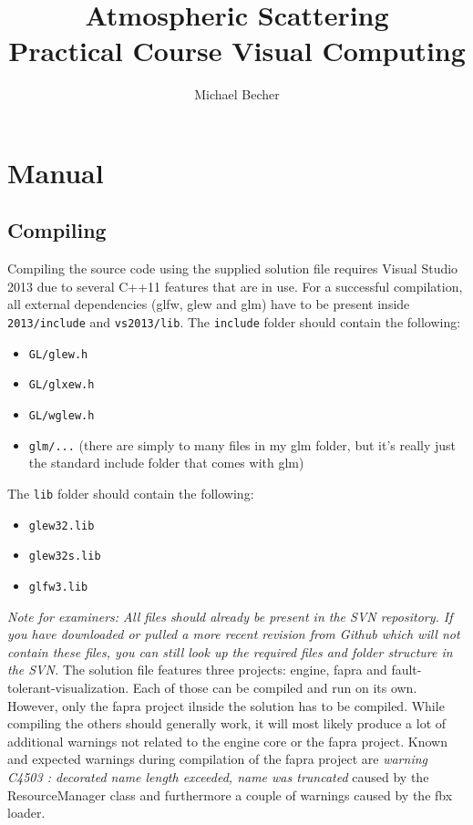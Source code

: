 \documentclass[12pt]{article}
\title{
	Atmospheric Scattering \\ 
	Practical Course Visual Computing
}
\author{
	Michael Becher \\
}
\date{}
\begin{document}
\maketitle
\section*{Manual}
\subsection*{Compiling}
Compiling the source code using the supplied solution file requires Visual Studio 2013 due to several C++11 features that are in use.\newline
For a successful compilation, all external dependencies (glfw, glew and glm) have to be present inside \texttt{2013/include} and \texttt{vs2013/lib}. The \texttt{include} folder should contain the following:
\begin{itemize}
\item \texttt{GL/glew.h}
\item \texttt{GL/glxew.h}
\item \texttt{GL/wglew.h}
\item \texttt{glm/...} \newline (there are simply to many files in my glm folder, but it's really just the standard include folder that comes with glm)
\end{itemize}
The \texttt{lib} folder should contain the following:
\begin{itemize}
\item \texttt{glew32.lib}
\item \texttt{glew32s.lib}
\item \texttt{glfw3.lib}
\end{itemize}
\textit{Note for examiners:\newline
All files should already be present in the SVN repository. If you have downloaded or pulled a more recent revision from Github which will not contain these files, you can still look up the required files and folder structure in the SVN.}
\vspace{1cm}\newline
The solution file features three projects: engine, fapra and fault-tolerant-visualization. Each of those can be compiled and run on its own. However, only the fapra project ilnside the solution has to be compiled. While compiling the others should generally work, it will most likely produce a lot of additional warnings not related to the engine core or the fapra project. Known and expected warnings during compilation of the fapra project are \textit{warning C4503 : decorated name length exceeded, name was truncated} caused by the ResourceManager class and furthermore a couple of warnings caused by the fbx loader.
\end{document}
